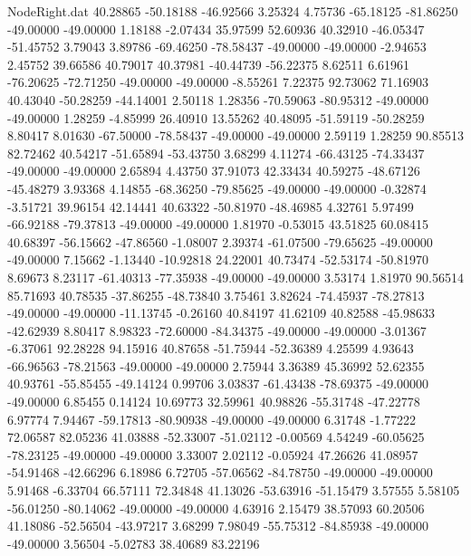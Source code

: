 \begin{filecontents}{NodeRight.dat}
  40.28865  -50.18188  -46.92566     3.25324    4.75736  -65.18125  -81.86250  -49.00000  -49.00000    1.18188   -2.07434   35.97599   52.60936
  40.32910  -46.05347  -51.45752     3.79043    3.89786  -69.46250  -78.58437  -49.00000  -49.00000   -2.94653    2.45752   39.66586   40.79017
  40.37981  -40.44739  -56.22375     8.62511    6.61961  -76.20625  -72.71250  -49.00000  -49.00000   -8.55261    7.22375   92.73062   71.16903
  40.43040  -50.28259  -44.14001     2.50118    1.28356  -70.59063  -80.95312  -49.00000  -49.00000    1.28259   -4.85999   26.40910   13.55262
  40.48095  -51.59119  -50.28259     8.80417    8.01630  -67.50000  -78.58437  -49.00000  -49.00000    2.59119    1.28259   90.85513   82.72462
  40.54217  -51.65894  -53.43750     3.68299    4.11274  -66.43125  -74.33437  -49.00000  -49.00000    2.65894    4.43750   37.91073   42.33434
  40.59275  -48.67126  -45.48279     3.93368    4.14855  -68.36250  -79.85625  -49.00000  -49.00000   -0.32874   -3.51721   39.96154   42.14441
  40.63322  -50.81970  -48.46985     4.32761    5.97499  -66.92188  -79.37813  -49.00000  -49.00000    1.81970   -0.53015   43.51825   60.08415
  40.68397  -56.15662  -47.86560    -1.08007    2.39374  -61.07500  -79.65625  -49.00000  -49.00000    7.15662   -1.13440  -10.92818   24.22001
  40.73474  -52.53174  -50.81970     8.69673    8.23117  -61.40313  -77.35938  -49.00000  -49.00000    3.53174    1.81970   90.56514   85.71693
  40.78535  -37.86255  -48.73840     3.75461    3.82624  -74.45937  -78.27813  -49.00000  -49.00000  -11.13745   -0.26160   40.84197   41.62109
  40.82588  -45.98633  -42.62939     8.80417    8.98323  -72.60000  -84.34375  -49.00000  -49.00000   -3.01367   -6.37061   92.28228   94.15916
  40.87658  -51.75944  -52.36389     4.25599    4.93643  -66.96563  -78.21563  -49.00000  -49.00000    2.75944    3.36389   45.36992   52.62355
  40.93761  -55.85455  -49.14124     0.99706    3.03837  -61.43438  -78.69375  -49.00000  -49.00000    6.85455    0.14124   10.69773   32.59961
  40.98826  -55.31748  -47.22778     6.97774    7.94467  -59.17813  -80.90938  -49.00000  -49.00000    6.31748   -1.77222   72.06587   82.05236
  41.03888  -52.33007  -51.02112    -0.00569    4.54249  -60.05625  -78.23125  -49.00000  -49.00000    3.33007    2.02112   -0.05924   47.26626
  41.08957  -54.91468  -42.66296     6.18986    6.72705  -57.06562  -84.78750  -49.00000  -49.00000    5.91468   -6.33704   66.57111   72.34848
  41.13026  -53.63916  -51.15479     3.57555    5.58105  -56.01250  -80.14062  -49.00000  -49.00000    4.63916    2.15479   38.57093   60.20506
  41.18086  -52.56504  -43.97217     3.68299    7.98049  -55.75312  -84.85938  -49.00000  -49.00000    3.56504   -5.02783   38.40689   83.22196

\end{filecontents}
